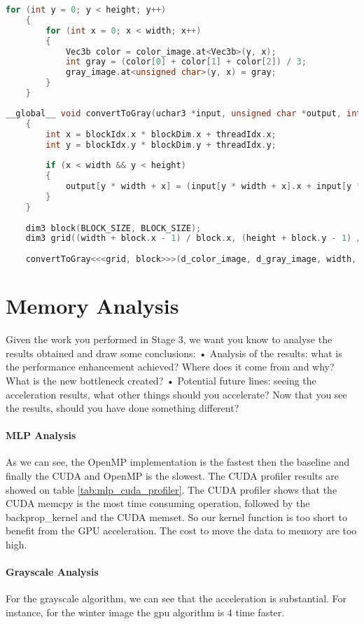 \documentclass[11pt]{article}
\begin{document}
\begin{lstlisting}[language=C, caption="Original grayscale code"]
	for (int y = 0; y < height; y++)
	{
		for (int x = 0; x < width; x++)
		{
			Vec3b color = color_image.at<Vec3b>(y, x);
			int gray = (color[0] + color[1] + color[2]) / 3;
			gray_image.at<unsigned char>(y, x) = gray;
		}
	}
\end{lstlisting}


\begin{lstlisting}[language=C, caption="CUDA kernel function to convert image to grayscale"]
	__global__ void convertToGray(uchar3 *input, unsigned char *output, int width, int height)
	{
		int x = blockIdx.x * blockDim.x + threadIdx.x;
		int y = blockIdx.y * blockDim.y + threadIdx.y;
	
		if (x < width && y < height)
		{
			output[y * width + x] = (input[y * width + x].x + input[y * width + x].y + input[y * width + x].z) / 3;
		}
	}
	
	dim3 block(BLOCK_SIZE, BLOCK_SIZE);
	dim3 grid((width + block.x - 1) / block.x, (height + block.y - 1) / block.y);
	
	convertToGray<<<grid, block>>>(d_color_image, d_gray_image, width, height);
\end{lstlisting}


\section{Memory Analysis}

\pagebreak
{}

Given the work you performed in Stage 3, we want you know to analyse the results obtained and draw
some conclusions:
• Analysis of the results: what is the performance enhancement achieved? Where does it come
from and why? What is the new bottleneck created?
• Potential future lines: seeing the acceleration results, what other things should you accelerate?
Now that you see the results, should you have done something different?

\paragraph*{MLP Analysis} As we can see, the OpenMP implementation is the fastest then the baseline and finally the CUDA and OpenMP is the slowest.
The CUDA profiler results are showed on table \ref{tab:mlp_cuda_profiler}.
The CUDA profiler shows that the CUDA memcpy is the most time consuming operation, followed by the backprop\_kernel and the CUDA memset.
So our kernel function is too short to benefit from the GPU acceleration. The cost to move the data to memory are too high.

\paragraph*{Grayscale Analysis}
For the grayscale algorithm, we can see that the acceleration is substantial. For instance, for the winter image the gpu algorithm is 4 time faster.
\end{document}
